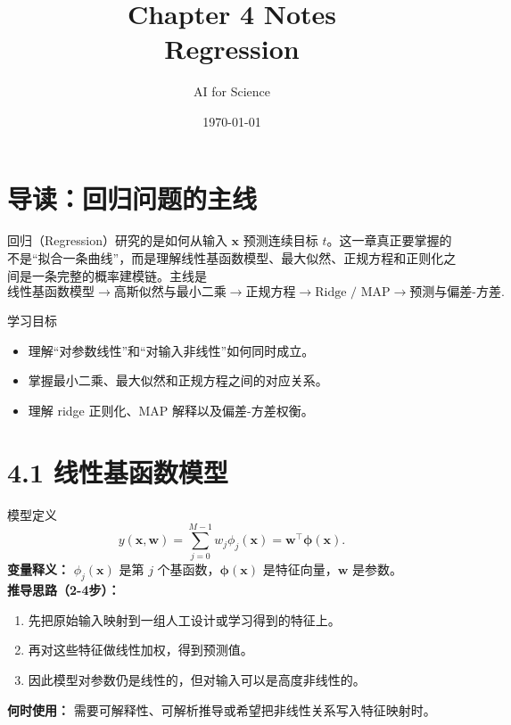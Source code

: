 ﻿\documentclass[11pt]{article}
\title{Chapter 4 Notes\\\large Regression}
\author{AI for Science}
\date{\today}
\begin{document}
\maketitle
\tableofcontents
\newpage

\section{导读：回归问题的主线}
回归（Regression）研究的是如何从输入 $\mathbf x$ 预测连续目标 $t$。这一章真正要掌握的不是“拟合一条曲线”，而是理解线性基函数模型、最大似然、正规方程和正则化之间是一条完整的概率建模链。主线是
\[
\text{线性基函数模型} \rightarrow \text{高斯似然与最小二乘} \rightarrow \text{正规方程} \rightarrow \text{Ridge / MAP} \rightarrow \text{预测与偏差-方差}.
\]

\begin{insightbox}{学习目标}
\begin{itemize}[leftmargin=1.6em]
  \item 理解“对参数线性”和“对输入非线性”如何同时成立。
  \item 掌握最小二乘、最大似然和正规方程之间的对应关系。
  \item 理解 ridge 正则化、MAP 解释以及偏差-方差权衡。
\end{itemize}
\end{insightbox}

\section{4.1 线性基函数模型}
\begin{formulabox}{模型定义}
\begin{equation}
y(\mathbf x,\mathbf w)=\sum_{j=0}^{M-1} w_j\phi_j(\mathbf x)=\mathbf w^\top \boldsymbol\phi(\mathbf x).
\end{equation}
\textbf{变量释义：} $\phi_j(\mathbf x)$ 是第 $j$ 个基函数，$\boldsymbol\phi(\mathbf x)$ 是特征向量，$\mathbf w$ 是参数。\\
\textbf{推导思路（2-4步）：}
\begin{enumerate}[leftmargin=1.6em]
  \item 先把原始输入映射到一组人工设计或学习得到的特征上。
  \item 再对这些特征做线性加权，得到预测值。
  \item 因此模型对参数仍是线性的，但对输入可以是高度非线性的。
\end{enumerate}
\textbf{何时使用：} 需要可解释性、可解析推导或希望把非线性关系写入特征映射时。
\end{formulabox}
\end{document}
